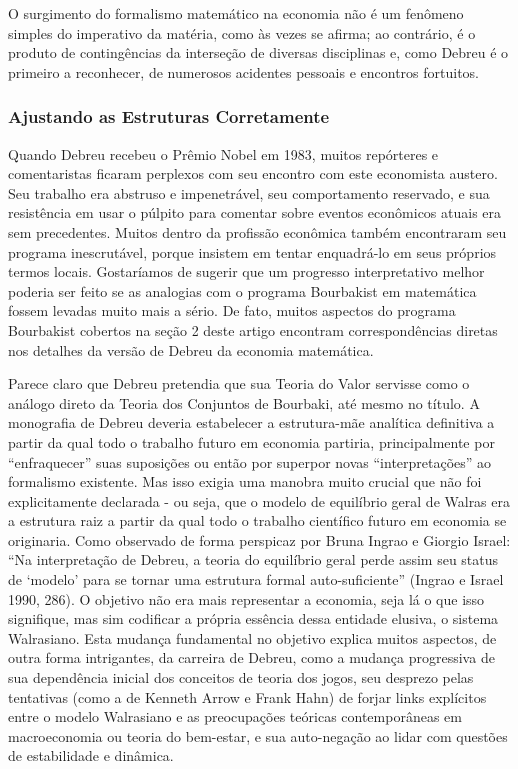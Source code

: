 \documentclass[12pt]{article}
\begin{document}
O surgimento do formalismo matemático na economia não é um fenômeno simples do imperativo da matéria, como às vezes se afirma; ao contrário, é o produto de contingências da interseção de diversas disciplinas e, como Debreu é o primeiro a reconhecer, de numerosos acidentes pessoais e encontros fortuitos.

\subsubsection{\textbf{Ajustando as Estruturas Corretamente}}
Quando Debreu recebeu o Prêmio Nobel em 1983, muitos repórteres e comentaristas ficaram perplexos com seu encontro com este economista austero. Seu trabalho era abstruso e impenetrável, seu comportamento reservado, e sua resistência em usar o púlpito para comentar sobre eventos econômicos atuais era sem precedentes. Muitos dentro da profissão econômica também encontraram seu programa inescrutável, porque insistem em tentar enquadrá-lo em seus próprios termos locais. Gostaríamos de sugerir que um progresso interpretativo melhor poderia ser feito se as analogias com o programa Bourbakist em matemática fossem levadas muito mais a sério. De fato, muitos aspectos do programa Bourbakist cobertos na seção 2 deste artigo encontram correspondências diretas nos detalhes da versão de Debreu da economia matemática.

Parece claro que Debreu pretendia que sua Teoria do Valor servisse como o análogo direto da Teoria dos Conjuntos de Bourbaki, até mesmo no título. A monografia de Debreu deveria estabelecer a estrutura-mãe analítica definitiva a partir da qual todo o trabalho futuro em economia partiria, principalmente por “enfraquecer” suas suposições ou então por superpor novas “interpretações” ao formalismo existente. Mas isso exigia uma manobra muito crucial que não foi explicitamente declarada - ou seja, que o modelo de equilíbrio geral de Walras era a estrutura raiz a partir da qual todo o trabalho científico futuro em economia se originaria. Como observado de forma perspicaz por Bruna Ingrao e Giorgio Israel: “Na interpretação de Debreu, a teoria do equilíbrio geral perde assim seu status de ‘modelo’ para se tornar uma estrutura formal auto-suficiente” (Ingrao e Israel 1990, 286). O objetivo não era mais representar a economia, seja lá o que isso signifique, mas sim codificar a própria essência dessa entidade elusiva, o sistema Walrasiano. Esta mudança fundamental no objetivo explica muitos aspectos, de outra forma intrigantes, da carreira de Debreu, como a mudança progressiva de sua dependência inicial dos conceitos de teoria dos jogos, seu desprezo pelas tentativas (como a de Kenneth Arrow e Frank Hahn) de forjar links explícitos entre o modelo Walrasiano e as preocupações teóricas contemporâneas em macroeconomia ou teoria do bem-estar, e sua auto-negação ao lidar com questões de estabilidade e dinâmica.
\end{document}
